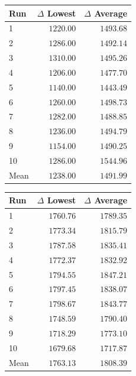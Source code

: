 \begin{table}[H]
    \centering
    \begin{minipage}[t]{0.48\textwidth}
        \centering
        \label{tab:gain-binary-full}
        \small
        \setlength{\tabcolsep}{4pt}
        \begin{tabular}{lrr}
            \toprule
            \textbf{Run} & \textbf{$\Delta$ Lowest} & \textbf{$\Delta$ Average} \\
            \midrule
            1 & $1220.00$ & $1493.68$ \\
            2 & $1286.00$ & $1492.14$ \\
            3 & $1310.00$ & $1495.26$ \\
            4 & $1206.00$ & $1477.70$ \\
            5 & $1140.00$ & $1443.49$ \\
            6 & $1260.00$ & $1498.73$ \\
            7 & $1282.00$ & $1488.85$ \\
            8 & $1236.00$ & $1494.79$ \\
            9 & $1154.00$ & $1490.25$ \\
            10 & $1286.00$ & $1544.96$ \\
            \midrule
            Mean & $1238.00$ & $1491.99$ \\
            \bottomrule
        \end{tabular}
    \end{minipage}
    \hfill
    \begin{minipage}[t]{0.48\textwidth}
        \centering
        \label{tab:gain-uniform-square}
        \small
        \setlength{\tabcolsep}{4pt}
        \begin{tabular}{lrr}
            \toprule
            \textbf{Run} & \textbf{$\Delta$ Lowest} & \textbf{$\Delta$ Average} \\
            \midrule
            1 & $1760.76$ & $1789.35$ \\
            2 & $1773.34$ & $1815.79$ \\
            3 & $1787.58$ & $1835.41$ \\
            4 & $1772.37$ & $1832.92$ \\
            5 & $1794.55$ & $1847.21$ \\
            6 & $1797.45$ & $1838.07$ \\
            7 & $1798.67$ & $1843.77$ \\
            8 & $1748.59$ & $1790.40$ \\
            9 & $1718.29$ & $1773.10$ \\
            10 & $1679.68$ & $1717.87$ \\
            \midrule
            Mean & $1763.13$ & $1808.39$ \\
            \bottomrule
        \end{tabular}
    \end{minipage}
\end{table}

